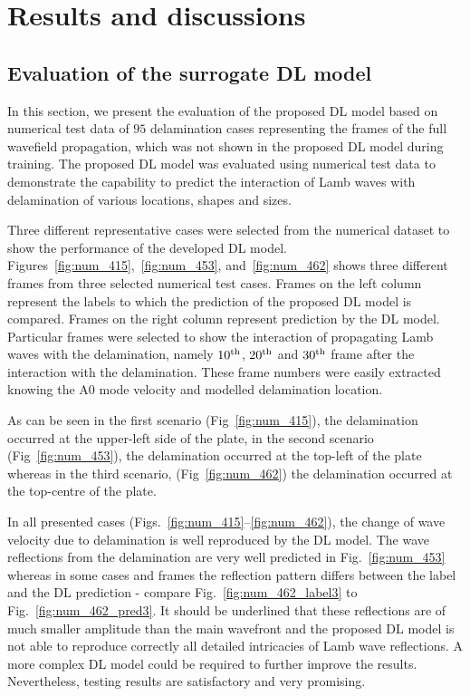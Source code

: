 \section{Results and discussions}
\subsection{Evaluation of the surrogate DL model}
In this section, we present the evaluation of the proposed DL model based on numerical test data of \(95\) delamination cases representing the frames of the full wavefield propagation, which was not shown in the proposed DL model during training. 
The proposed DL model was evaluated using numerical test data to demonstrate the capability to predict the interaction of Lamb waves with delamination of various locations, shapes and sizes.

Three different representative cases were selected from the numerical dataset to show the performance of the developed DL model.
Figures~\ref{fig:num_415},~\ref{fig:num_453}, 
and~\ref{fig:num_462} shows three different frames from three selected numerical test cases.  
Frames on the left column represent the labels to which the prediction of the proposed DL model is compared.
Frames on the right column represent prediction by the DL model.
Particular frames were selected to show the interaction of propagating Lamb waves with the delamination, namely $10\textsuperscript{th}$, $20\textsuperscript{th}$ and $30\textsuperscript{th}$ frame after the interaction with the delamination. These frame numbers were easily extracted knowing the A0 mode velocity and modelled delamination location. 

As can be seen in the first scenario (Fig~\ref{fig:num_415}), the delamination occurred at the upper-left side of the plate, in the second scenario (Fig~\ref{fig:num_453}), the delamination occurred at the top-left of the plate whereas in the third scenario, (Fig~\ref{fig:num_462}) the delamination occurred at the top-centre of the plate. 

In all presented cases (Figs.~\ref{fig:num_415}--\ref{fig:num_462}), the change of wave velocity due to delamination is well reproduced by the DL model.
The wave reflections from the delamination are very well predicted in Fig.~\ref{fig:num_453} whereas in some cases and frames the reflection pattern differs between the label and the DL prediction - compare Fig.~\ref{fig:num_462_label3} to Fig.~\ref{fig:num_462_pred3}.
It should be underlined that these reflections are of much smaller amplitude than the main wavefront and the proposed DL model is not able to reproduce correctly all detailed intricacies of Lamb wave reflections. 
A more complex DL model could be required to further improve the results.
Nevertheless, testing results are satisfactory and very promising.

